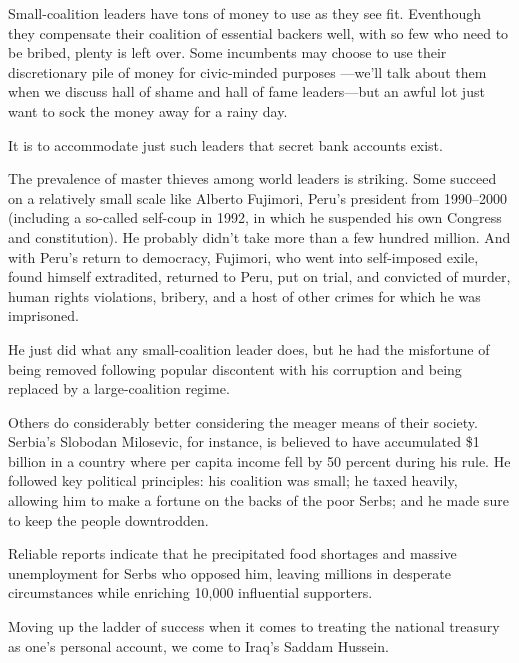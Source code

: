 \documentclass[10pt]{article}
\begin{document}
{\large Small-coalition leaders have tons of money to use as they see fit.
Eventhough they compensate their coalition of essential backers well, with so few
who need to be bribed, plenty is left over. Some incumbents may choose to use
their discretionary pile of money for civic-minded purposes ---we'll talk about
them when we discuss hall of shame and hall of fame leaders---but an awful lot
just want to sock the money away for a rainy day.}

{\large It is to accommodate just such leaders that secret bank accounts exist.}

{\large The prevalence of master thieves among world leaders is striking. Some
succeed on a relatively small scale like Alberto Fujimori, Peru's president from
1990--2000 (including a so-called self-coup in 1992, in which he suspended his
own Congress and constitution). He probably didn't take more than a few hundred
million. And with Peru's return to democracy, Fujimori, who went into
self-imposed exile, found himself extradited, returned to Peru, put on trial, and
convicted of murder, human rights violations, bribery, and a host of other crimes
for which he was imprisoned.}

{\large He just did what any small-coalition leader does, but he had the
misfortune of being removed following popular discontent with his corruption and
being replaced by a large-coalition regime.}

{\large Others do considerably better considering the meager means of their
society. Serbia's Slobodan Milosevic, for instance, is believed to have
accumulated \$1 billion in a country where per capita income fell by 50 percent
during his rule. He followed key political principles: his coalition was small;
he taxed heavily, allowing him to make a fortune on the backs of the poor Serbs;
and he made sure to keep the people downtrodden.}

{\large Reliable reports indicate that he precipitated food shortages and
massive unemployment for Serbs who opposed him, leaving millions in desperate
circumstances while enriching 10,000 influential supporters.}

{\large Moving up the ladder of success when it comes to treating the national
treasury as one's personal account, we come to Iraq's Saddam Hussein.}
\end{document}
